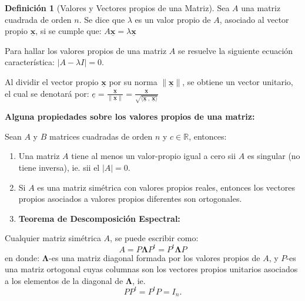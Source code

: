 \documentclass[
]{book}
\theoremstyle{definition}
\newtheorem{definition}{Definición}[chapter]
\theoremstyle{definition}
\theoremstyle{definition}
\theoremstyle{definition}
\theoremstyle{remark}
\begin{document}
\begin{definition}[Valores y Vectores propios de una Matriz]
\protect\hypertarget{def:val-vect-propios}{}\label{def:val-vect-propios}Sea \(A\) una matriz cuadrada de orden \(n\). Se dice que \(\lambda\) es un valor propio de \(A\), asociado al vector propio \(\underline{\mathbf{x}}\), si se cumple que: \(A\underline{\mathbf{x}}=\lambda \underline{\mathbf{x}}\)

Para hallar los valores propios de una matriz \(A\) se resuelve la siguiente ecuación característica: \(|A-\lambda I|=0\).

Al dividir el vector propio \(\underline{\mathbf{x}}\) por su norma \(\|\underline{\mathbf{x}}\|\), se obtiene un vector unitario, el cual se denotará por: \(\underline{e}=\frac{\underline{\mathbf{x}}}{\|\underline{\mathbf{x}}\|}=\frac{\underline{\mathbf{x}}}{\sqrt{\langle \underline{\mathbf{x}}\ , \ \underline{\mathbf{x}} \rangle}}\)
\end{definition}

\textbf{Alguna propiedades sobre los valores propios de una matriz:}

Sean \(A\) y \(B\) matrices cuadradas de orden \(n\) y \(c\in \mathbb{R}\), entonces:

\begin{enumerate}
\def\labelenumi{\alph{enumi}.}
\item
  Una matriz \(A\) tiene al menos un valor-propio igual a cero sii \(A\) es singular (no tiene inversa), ie. sii el \(|A|=0\).
\item
  Si \(A\) es una matriz simétrica con valores propios reales, entonces los vectores propios asociados a valores propios diferentes son ortogonales.
\item
  \textbf{Teorema de Descomposición Espectral:}
\end{enumerate}

Cualquier matriz simétrica \(A\), se puede escribir como:
\[
A=P\mathbf{\Lambda} P^t=P^t\mathbf{\Lambda} P
\]
en donde: \(\mathbf{\Lambda}\)-es una matriz diagonal formada por los valores propios de \(A\), y \(P\)-es una matriz ortogonal cuyas columnas son los vectores propios unitarios asociados a los elementos de la diagonal de \(\mathbf{\Lambda}\), ie.
\[
PP^t=P^tP=I_n.
\]
\end{document}
